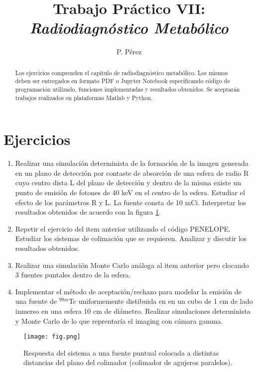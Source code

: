\documentclass[a4paper,10pt]{article}
\title{{\bf Trabajo Práctico VII:}\\ \emph{Radiodiagnóstico Metabólico}}
\author{P. Pérez}
\begin{document}
\maketitle

\begin{abstract}
Los ejercicios comprenden el capítulo de radiodiagnóstico metabólico. Los mismos deben ser entregados en formato PDF o Jupyter Notebook especificando código de programación utilizado, funciones implementadas y resultados obtenidos. Se aceptarán trabajos realizados en plataformas Matlab y Python.
\end{abstract}

\section*{Ejercicios}

\begin{enumerate}
 \item Realizar una simulación determinista de la formación de la imagen generada en un plano de detección por contaste de absorción de una esfera de radio R cuyo centro dista L del plano de detección y dentro de la misma existe un punto de emisión de fotones de 40 keV en el centro de la esfera. Estudiar el efecto de los parámetros R y L. La fuente consta de 10 mCi. Interpretar los resultados obtenidos de acuerdo con la figura \ref{fig}.
 \item  Repetir el ejercicio del item anterior utilizando el código PENELOPE. Estudiar los sistemas de colimación que se requieren. Analizar y discutir los resultados obtenidos.
 \item Realizar una simulación Monte Carlo análoga al item anterior pero clocando 3 fuentes puntales dentro de la esfera.
 \item  Implementar el método de aceptación/rechazo para modelar la emisión de una fuente de $^{99m}$Tc uniformemente distibuida en en un cubo de 1 cm de lado inmerso en una esfera 10 cm de diámetro. Realizar simulaciones determinista y Monte Carlo de lo que reprentaría el imaging con cámara gamma.
\end{enumerate}

\begin{figure}
 \centering
 \texttt{[image: fig.png]}
 \caption{Respuesta del sistema a una fuente puntual colocada a distintas distancias del plano del colimador (colimador de agujeros paralelos).}
 \label{fig}
\end{figure}
\end{document}
